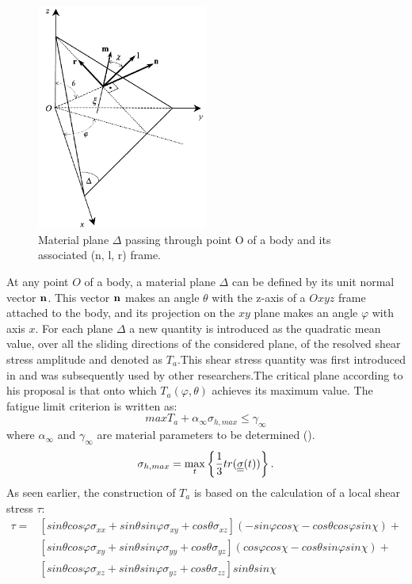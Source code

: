 \begin{figure}[h!]
	\centering
	\includegraphics[width=0.5\textwidth]{figures//demopp.png} 
	\caption{Material plane $\Delta$ passing through point O of a body and its
		associated (n, l, r) frame.}
	\label{figpapa}
\end{figure}
At any point $O$ of a body, a material plane $\Delta$ can be defined by its unit normal vector $\bf n$. This vector
$\bf n$ makes an angle $\theta$ with the z-axis of a $Oxyz$ frame attached to the body, and its projection on the $xy$ plane
makes an angle $\varphi$ with axis $x$. For each plane $\Delta$ a new quantity is introduced as the quadratic mean value, over all the sliding directions of the considered plane, of the resolved shear stress amplitude and denoted as $T_a$.This shear stress quantity was first introduced in \cite{Papadopoulos1996513}
and was subsequently used by other researchers.The critical plane according to his proposal is that onto which $T_a(\varphi,\theta)$ achieves its maximum value. The fatigue limit criterion is written as:
\begin{equation}
	max T_a+\alpha_\infty \sigma_{h,max}\leqslant \gamma_\infty
	\label{eq.papa}
\end{equation}
where $\alpha_\infty$ and $\gamma_\infty$ are material parameters to be determined (\cite{papadopoulos2001long}).
$$\sigma_{h,max}=\max\limits_{t}\left\lbrace \dfrac{1}{3}tr(\uline{\uline{\sigma}}(t))\right\rbrace. $$
As seen earlier, the construction of $T_a$ is based on the calculation of a local shear stress $\tau$:
\begin{equation}
	\begin{split}
		\tau=&[sin\theta cos\varphi\sigma_{xx}+sin\theta sin\varphi\sigma_{xy}+cos\theta\sigma_{xz}](-sin\varphi cos\chi-cos\theta cos\varphi sin\chi)+\\&[sin\theta cos\varphi\sigma_{xy}+sin\theta sin\varphi\sigma_{yy}+cos\theta\sigma_{yz}](cos\varphi cos\chi-cos\theta sin\varphi sin\chi)+\\&[sin\theta cos\varphi\sigma_{xz}+sin\theta sin\varphi\sigma_{yz}+cos\theta\sigma_{zz}]sin\theta sin\chi
	\end{split} 
	\label{eqres}
\end{equation}
